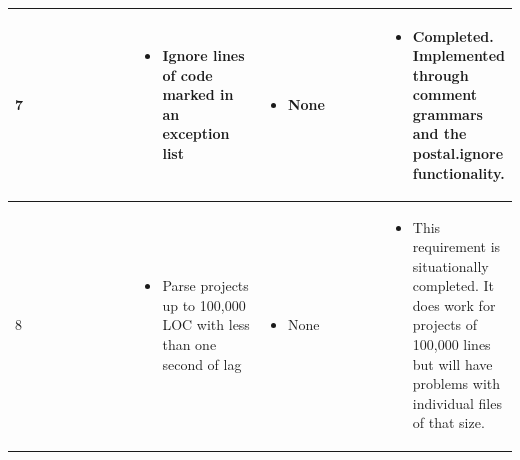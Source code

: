 \documentclass[letterpaper,10pt,titlepage,draftclsnofoot,onecolumn,onesided] {IEEEtran}
\begin{document}
{\begin{center}
\begin{singlespace}
\begin{tabular}{ |  p{0.25\linewidth}  |  p{0.25\linewidth}  | p{0.25\linewidth} | p{0.25\linewidth} |}
        	7
		& 
			\begin{itemize}
				\item Ignore lines of code marked in an exception list
			\end{itemize}
		& 
			\begin{itemize}
				\item None
			\end{itemize}
		&
			\begin{itemize}
				\item Completed. Implemented through comment grammars and the postal.ignore functionality.
			\end{itemize} 
		
        \\ \hline

        	8
		& 
			\begin{itemize}
				\item Parse projects up to 100,000 LOC with less than one second of lag
			\end{itemize}
		& 
			\begin{itemize}
				\item None
			\end{itemize}
		&
			\begin{itemize}
				\item This requirement is situationally completed. 
                It does work for projects of 100,000 lines but will have problems with individual files of that size.
			\end{itemize} 
		
        \\ \hline
		\end{tabular}
	\end{singlespace}
\end{center}
}
\end{document}
